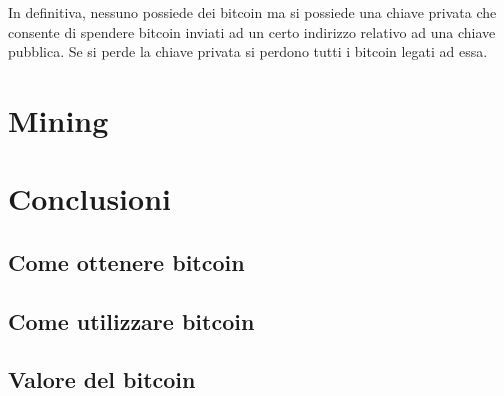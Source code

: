 In definitiva, nessuno possiede dei bitcoin ma si possiede una chiave privata che consente di spendere bitcoin inviati
ad un certo indirizzo relativo ad una chiave pubblica. Se si perde la chiave privata si perdono tutti i bitcoin
legati ad essa.

\section{Mining}

\section{Conclusioni}
\subsection{Come ottenere bitcoin}
\subsection{Come utilizzare bitcoin}
\subsection{Valore del bitcoin}